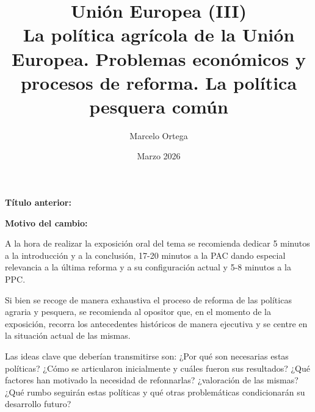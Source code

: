 \documentclass[10pt,a4paper]{article}
\title{Unión Europea (III)\\
\large La política agrícola de la Unión Europea. Problemas económicos y procesos de reforma. La política pesquera común}
\author{Marcelo Ortega}
\date{Marzo 2026}
\newcommand{\puntosclave}[1]{%
  \begin{tcolorbox}[
    colframe=black,
    title={Puntos clave},
    before upper={\setlength{\parindent}{0.5cm}\setlength{\parskip}{0.5\baselineskip}}
  ]
  #1
  \end{tcolorbox}
}
\newcommand{\changebox}{%
\begin{tcolorbox}[title={Historial de cambios del tema}]
\textbf{Título anterior:} \OldTitle\par
\textbf{Motivo del cambio:} \ChangeWhy
\end{tcolorbox}
}
\begin{document}
\maketitle
\changebox

\newpage

\puntosclave{ %
     A la hora de realizar la exposición oral del tema se recomienda dedicar 5 minutos a la introducción y a la conclusión, 17-20 minutos a la PAC dando especial relevancia a la última reforma y a su configuración actual y 5-8 minutos a la PPC.

     Si bien se recoge de manera exhaustiva el proceso de reforma de las políticas agraria y pesquera, se recomienda al opositor que, en el momento de la exposición, recorra los antecedentes históricos de manera ejecutiva y se centre en la situación actual de las mismas.

     Las ideas clave que deberían transmitirse son: ¿Por qué son necesarias estas políticas? ¿Cómo se articularon inicialmente y cuáles fueron sus resultados? ¿Qué factores han motivado la necesidad de refonnarlas? ¿valoración de las mismas? ¿Qué rumbo seguirán estas políticas y qué otras problemáticas condicionarán su desarrollo futuro?
    }
\vspace{1cm}
\end{document}
